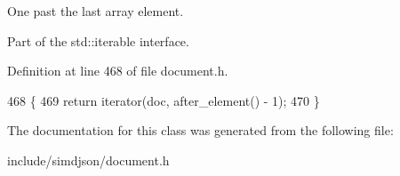 One past the last array element. 

Part of the std\+::iterable interface. 

Definition at line 468 of file document.\+h.


\begin{DoxyCode}
468                                                                \{
469   \textcolor{keywordflow}{return} iterator(doc, after\_element() - 1);
470 \}
\end{DoxyCode}


The documentation for this class was generated from the following file\+:\begin{DoxyCompactItemize}
\item 
include/simdjson/document.\+h\end{DoxyCompactItemize}
